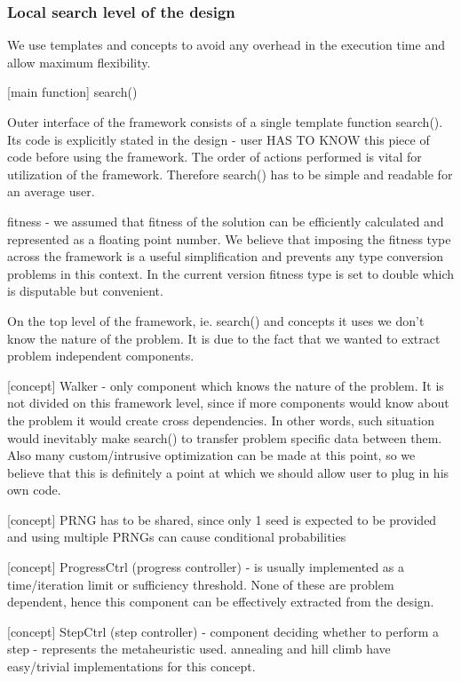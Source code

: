 \subsubsection{Local search level of the design}

We use templates and concepts to avoid any overhead in the execution time and allow maximum flexibility.

[main function] search()

Outer interface of the framework consists of a single template function search().
Its code is explicitly stated in the design - user HAS TO KNOW this piece of code before using the framework.
The order of actions performed is vital for utilization of the framework.
Therefore search() has to be simple and readable for an average user.

fitness - we assumed that fitness of the solution can be efficiently calculated and represented as a floating point number.
We believe that imposing the fitness type across the framework is a useful simplification and prevents any type conversion problems in this context.
In the current version fitness type is set to double which is disputable but convenient.

On the top level of the framework, ie. search() and concepts it uses we don't know the nature of the problem.
It is due to the fact that we wanted to extract problem independent components.

[concept] Walker - only component which knows the nature of the problem.
	It is not divided on this framework level, since if more components would know about the problem it would create cross dependencies.
	In other words, such situation would inevitably make search() to transfer problem specific data between them.
	Also many custom/intrusive optimization can be made at this point, so we believe that this is definitely a point at which we should allow user to plug in
	his own code.

[concept] PRNG has to be shared, since only 1 seed is expected to be provided and using multiple PRNGs can cause conditional probabilities

[concept] ProgressCtrl (progress controller) - is usually implemented as a time/iteration limit or sufficiency threshold.
None of these are problem dependent, hence this component can be effectively extracted from the design.

[concept] StepCtrl (step controller) - component deciding whether to perform a step - represents the metaheuristic used.
annealing and hill climb have easy/trivial implementations for this concept.

